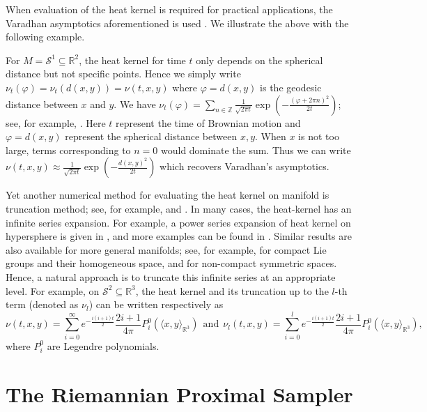 When evaluation of the heat kernel is required for practical applications, the Varadhan asymptotics aforementioned is used \citep{de2022riemannian}. We illustrate the above with the following example.
\begin{example}
    For $M = \mathcal{S}^{1} \subseteq \mathbb{R}^{2}$, the heat kernel for time $t$ only depends on the spherical distance but not specific points.
    Hence we simply write $\nu_{t}(\varphi) = \nu_{t}(d(x, y)) = \nu(t, x, y)$ where $\varphi = d(x, y)$ is the geodesic distance between $x$ and $y$.
    We have $\nu_{t}(\varphi) = \sum_{n \in \mathbb{Z}} \frac{1}{\sqrt{2\pi t}} \exp(- \frac{(\varphi+2\pi n)^{2}}{2t})$; see, for example, \cite{andersson2013estimates}.
    Here $t$ represent the time of Brownian motion and $\varphi = d(x, y)$ represent the spherical distance between $x, y$. 
    When $x$ is not too large, terms corresponding to $n = 0$ would dominate the sum. 
    Thus we can write 
    $\nu(t, x, y) \approx \frac{1}{\sqrt{2\pi t}} \exp(-\frac{d(x, y)^{2}}{2t} )$ which recovers Varadhan's asymptotics. 
\end{example}

Yet another numerical method for evaluating the heat kernel on manifold is truncation method; see, for example, \citet[Section 5.1]{corstanje2024simulating} and \cite{de2022riemannian}. In many cases, the heat-kernel has an infinite series expansion. For example, a power series expansion of heat kernel on hypersphere is given in \citet[Theorem 1]{zhao2018exact}, 
and more examples can be found in \citet[Example 1-5]{eltzner2021diffusion}. 
Similar results are also available for more general manifolds; see, for example, \cite{azangulov2022stationary} for compact 
Lie groups and their homogeneous space, 
and \cite{azangulov2024stationary} for non-compact symmetric spaces. Hence, a natural approach is to truncate this infinite series at an appropriate level. For example, on $\mathcal{S}^{2} \subseteq \mathbb{R}^{3}$, the heat kernel and its truncation up to the $l$-th term (denoted as $\nu_{l}$) can be written respectively as 
\begin{equation*}
    \nu(t, x, y) = \sum_{i = 0}^{\infty} e^{-\frac{i(i+1)t}{2}} \frac{2i+1}{4\pi} P_{i}^{0}(\langle x, y \rangle_{\mathbb{R}^{3}})~~\text{and}~~\nu_{l}(t, x, y) = \sum_{i = 0}^{l} e^{-\frac{i(i+1)t}{2}} \frac{2i+1}{4\pi} P_{i}^{0}(\langle x, y \rangle_{\mathbb{R}^{3}}),
\end{equation*}
where $P_{i}^{0}$ are Legendre polynomials.


\section{The Riemannian Proximal Sampler}

